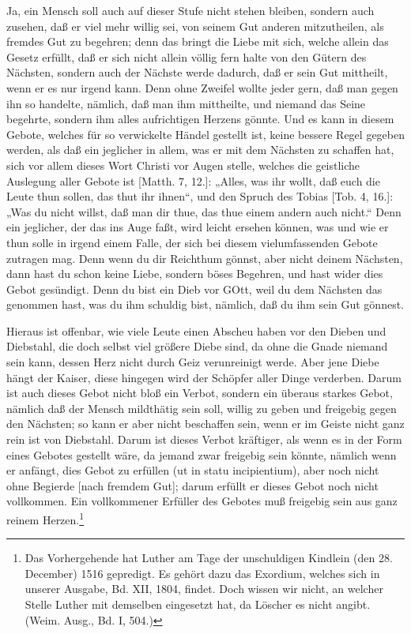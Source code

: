 Ja, ein Mensch soll auch auf dieser Stufe nicht stehen bleiben, sondern auch zusehen, daß er viel mehr willig sei, von seinem Gut anderen mitzutheilen, als fremdes Gut zu begehren; denn das bringt die Liebe mit sich, welche allein das Gesetz erfüllt, daß er sich nicht allein völlig fern halte von den Gütern des Nächsten, sondern auch der Nächste werde dadurch, daß er sein Gut mittheilt, wenn er es nur irgend kann. Denn ohne Zweifel wollte jeder gern, daß man gegen ihn so handelte, nämlich, daß man ihm mittheilte, und niemand das Seine begehrte, sondern ihm alles aufrichtigen Herzens gönnte. Und es kann in diesem Gebote, welches für so verwickelte Händel gestellt ist, keine bessere Regel gegeben werden, als daß ein jeglicher in allem, was er mit dem Nächsten zu schaffen hat, sich vor allem dieses Wort Christi vor Augen stelle, welches die geistliche Auslegung aller Gebote ist [Matth. 7, 12.]: „Alles, was ihr wollt, daß euch die Leute thun sollen, das thut ihr ihnen“, und den Spruch des Tobias [Tob. 4, 16.]: „Was du nicht willst, daß man dir thue, das thue einem andern auch nicht.“ Denn ein jeglicher, der das ins Auge faßt, wird leicht ersehen können, was und wie er thun solle in irgend einem Falle, der sich bei diesem vielumfassenden Gebote zutragen mag. Denn wenn du dir Reichthum gönnst, aber nicht deinem Nächsten, dann hast du schon keine Liebe, sondern böses Begehren, und hast wider dies Gebot gesündigt. Denn du bist ein Dieb vor GOtt, weil du dem Nächsten das genommen hast, was du ihm schuldig bist, nämlich, daß du ihm sein Gut gönnest.

Hieraus ist offenbar, wie viele Leute einen Abscheu haben vor den Dieben und Diebstahl, die doch selbst viel größere Diebe sind, da ohne die Gnade niemand sein kann, dessen Herz nicht durch Geiz verunreinigt werde. Aber jene Diebe hängt der Kaiser, diese hingegen wird der Schöpfer aller Dinge verderben. Darum ist auch dieses Gebot nicht bloß ein Verbot, sondern ein
überaus starkes Gebot, nämlich daß der Mensch mildthätig sein soll, willig zu geben und freigebig gegen den Nächsten; so kann er aber nicht beschaffen sein, wenn er im Geiste nicht ganz rein ist von Diebstahl. Darum ist dieses Verbot kräftiger, als wenn es in der Form eines Gebotes gestellt wäre, da jemand zwar freigebig sein könnte, nämlich wenn er anfängt, dies Gebot zu erfüllen (ut in statu incipientium), aber noch nicht ohne Begierde [nach fremdem Gut]; darum erfüllt er dieses Gebot noch nicht vollkommen. Ein vollkommener Erfüller des Gebotes muß freigebig sein aus ganz reinem Herzen.\footnote{Das Vorhergehende hat Luther am Tage der unschuldigen Kindlein (den 28. December) 1516 gepredigt. Es gehört dazu das Exordium, welches sich in unserer Ausgabe, Bd. XII, 1804, findet. Doch wissen wir nicht, an welcher Stelle Luther mit demselben eingesetzt hat, da Löscher es nicht angibt. (Weim. Ausg., Bd. I, 504.)}

